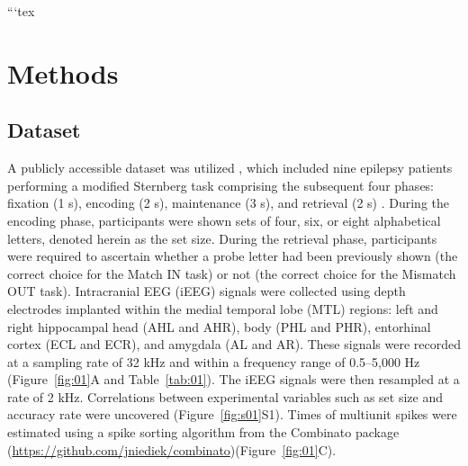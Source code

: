 ```tex
\section{Methods}
\subsection{Dataset}
A publicly accessible dataset was utilized \cite{boran_dataset_2020}, which included nine epilepsy patients performing a modified Sternberg task comprising the subsequent four phases: fixation (1 s), encoding (2 s), maintenance (3 s), and retrieval (2 s) \cite{boran_dataset_2020}. During the encoding phase, participants were shown sets of four, six, or eight alphabetical letters, denoted herein as the set size. During the retrieval phase, participants were required to ascertain whether a probe letter had been previously shown (the correct choice for the Match IN task) or not (the correct choice for the Mismatch OUT task). Intracranial EEG (iEEG) signals were collected using depth electrodes implanted within the medial temporal lobe (MTL) regions: left and right hippocampal head (AHL and AHR), body (PHL and PHR), entorhinal cortex (ECL and ECR), and amygdala (AL and AR). These signals were recorded at a sampling rate of 32 kHz and within a frequency range of 0.5--5,000 Hz (Figure~\ref{fig:01}A and Table~\ref{tab:01}). The iEEG signals were then resampled at a rate of 2 kHz. Correlations between experimental variables such as set size and accuracy rate were uncovered (Figure~\ref{fig:s01}S1). Times of multiunit spikes were estimated using a spike sorting algorithm \cite{niediek_reliable_2016} from the Combinato package (\url{https://github.com/jniediek/combinato})(Figure~\ref{fig:01}C).

